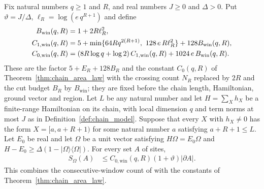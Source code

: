 \begin{corollary}
    \label{thm:chain_window_area_law}
    \leanok
    Fix natural numbers $q\ge1$ and $R$, and real numbers $J\ge0$ and
    $\Delta>0$. Put $\vartheta=J/\Delta$, $\ell_R=\log(e\,q^{R+1})$ and
    define
    \begin{align}
        B_{\mathrm{win}}(q,R)
         & =1+2R\ell_R^2,
        \label{eq:chain_window_budget}                  \\
        C_{1,\mathrm{win}}(q,R)
         & =5+\min\{64Rq^{2(R+1)},\ 128\,e\,R\ell_R^2\}
        +128B_{\mathrm{win}}(q,R),\notag                \\
        C_{0,\mathrm{win}}(q,R)
         & =(8R\log q+\log2)\,C_{1,\mathrm{win}}(q,R)
        +1024\,e\,B_{\mathrm{win}}(q,R).
        \label{eq:chain_window_area_constant}
    \end{align}
    These are the factor $5+E_R+128B_R$ and the constant $C_0(q,R)$ of
    Theorem~\ref{thm:chain_area_law} with the crossing count $N_R$ replaced by
    $2R$ and the cut budget $B_R$ by $B_{\mathrm{win}}$; they are fixed before
    the chain length, Hamiltonian, ground vector and region. Let $L$ be any
    natural number and let $H=\sum_X h_X$ be a finite-range Hamiltonian on
    its chain, with local dimension $q$ and term norms at most $J$ as in
    Definition~\ref{def:chain_model}. Suppose that every $X$ with
    $h_X\ne0$ has the form $X=[a,a+R+1)$ for some natural number $a$
    satisfying $a+R+1\le L$.
    Let $E_0$ be real and let $\Omega$ be a unit vector satisfying
    $H\Omega=E_0\Omega$ and
    $H-E_0\ge\Delta(1-|\Omega\rangle\langle\Omega|)$.
    For every set $A$ of sites,
    \begin{align}
        S_\Omega(A)
         & \le C_{0,\mathrm{win}}(q,R)(1+\vartheta)|\partial A|.
        \label{eq:chain_window_area_law}
    \end{align}
    This combines the consecutive-window count of
    \cite[Part~I, Remark~6.3]{TNLean2026OneDimensional} with the constants of
    Theorem~\ref{thm:chain_area_law}.
\end{corollary}
